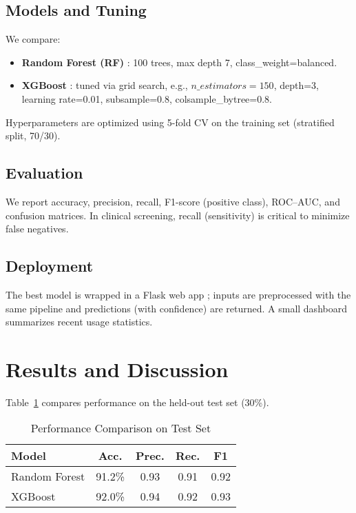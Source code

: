 \documentclass[conference]{IEEEtran}
\begin{document}
\subsection{Models and Tuning}
We compare:
\begin{itemize}
\item \textbf{Random Forest (RF)} \cite{breiman2001rf}: 100 trees, max depth 7, class\_weight=balanced.
\item \textbf{XGBoost} \cite{chen2016xgb}: tuned via grid search, e.g., \(n\_estimators=150\), depth=3, learning rate=0.01, subsample=0.8, colsample\_bytree=0.8.
\end{itemize}
Hyperparameters are optimized using 5-fold CV on the training set (stratified split, 70/30).

\subsection{Evaluation}
We report accuracy, precision, recall, F1-score (positive class), ROC--AUC, and confusion matrices. In clinical screening, recall (sensitivity) is critical to minimize false negatives.

\subsection{Deployment}
The best model is wrapped in a Flask web app \cite{flaskdocs}; inputs are preprocessed with the same pipeline and predictions (with confidence) are returned. A small dashboard summarizes recent usage statistics.

\section{Results and Discussion}
Table~\ref{tab:perf} compares performance on the held-out test set (30\%).

\begin{table}[!t]
\centering
\caption{Performance Comparison on Test Set}
\label{tab:perf}
\begin{tabular}{@{}lcccc@{}}
\toprule
\textbf{Model} & \textbf{Acc.} & \textbf{Prec.} & \textbf{Rec.} & \textbf{F1} \\
\midrule
Random Forest & 91.2\% & 0.93 & 0.91 & 0.92 \\
XGBoost & 92.0\% & 0.94 & 0.92 & 0.93 \\
\bottomrule
\end{tabular}
\end{table}
\end{document}
